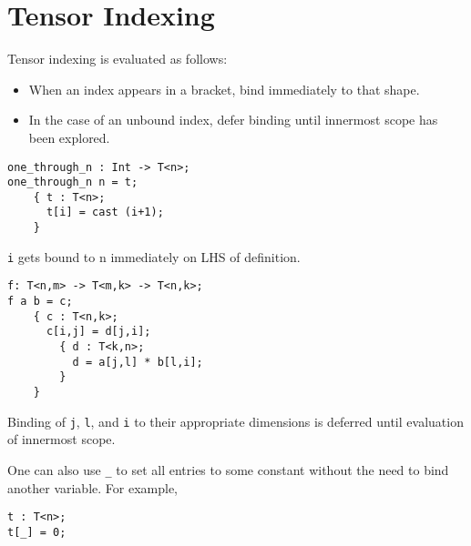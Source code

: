 \section{Tensor Indexing}%
\label{sec:tensor_indexing}
Tensor indexing is evaluated as follows:
\begin{itemize}
    \item When an index appears in a bracket, bind immediately to that shape.
    \item In the case of an unbound index, defer binding until 
        innermost scope has been explored.
\end{itemize}

\begin{lstlisting}[title={Fill a rank 1 tensor with entries 1 to n}]
one_through_n : Int -> T<n>;
one_through_n n = t; 
    { t : T<n>; 
      t[i] = cast (i+1);
    }
\end{lstlisting}
\verb|i| gets bound to n immediately on LHS of definition.

\begin{lstlisting}[title={Transpose of a Product}]
f: T<n,m> -> T<m,k> -> T<n,k>;
f a b = c; 
    { c : T<n,k>;
      c[i,j] = d[j,i];
        { d : T<k,n>;
          d = a[j,l] * b[l,i];
        }
    } 
\end{lstlisting}
Binding of \verb|j|, \verb|l|, and \verb|i| to their appropriate 
dimensions is deferred until evaluation of innermost scope. 
\par One can also use \verb|_| to set all entries to some 
constant without the need to bind another variable. For example,
\begin{lstlisting}
t : T<n>;
t[_] = 0;
\end{lstlisting}
